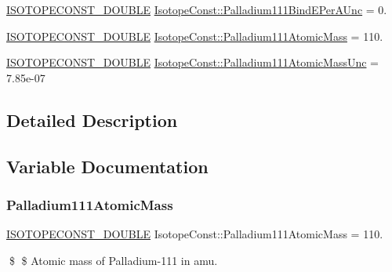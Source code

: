 \begin{DoxyCompactItemize}
\mbox{\hyperlink{group___isotope_const-_macros_ga8f45a7272ce02c0b4c65c44636ed719a}{I\+S\+O\+T\+O\+P\+E\+C\+O\+N\+S\+T\+\_\+\+D\+O\+U\+B\+LE}} \mbox{\hyperlink{group___isotope_const-_palladium-_pd111_ga1740871993ac710bd7fbffdfcb28a1eb}{Isotope\+Const\+::\+Palladium111\+Bind\+E\+Per\+A\+Unc}} = 0.
\item 
\mbox{\hyperlink{group___isotope_const-_macros_ga8f45a7272ce02c0b4c65c44636ed719a}{I\+S\+O\+T\+O\+P\+E\+C\+O\+N\+S\+T\+\_\+\+D\+O\+U\+B\+LE}} \mbox{\hyperlink{group___isotope_const-_palladium-_pd111_ga422aa436a782e6640e801fa681776fbe}{Isotope\+Const\+::\+Palladium111\+Atomic\+Mass}} = 110.
\item 
\mbox{\hyperlink{group___isotope_const-_macros_ga8f45a7272ce02c0b4c65c44636ed719a}{I\+S\+O\+T\+O\+P\+E\+C\+O\+N\+S\+T\+\_\+\+D\+O\+U\+B\+LE}} \mbox{\hyperlink{group___isotope_const-_palladium-_pd111_ga26053b0992e2b25d9604cf41f0a71ba8}{Isotope\+Const\+::\+Palladium111\+Atomic\+Mass\+Unc}} = 7.\+85e-\/07
\end{DoxyCompactItemize}


\subsection{Detailed Description}


\subsection{Variable Documentation}
\mbox{\label{group___isotope_const-_palladium-_pd111_ga422aa436a782e6640e801fa681776fbe}} 
\subsubsection{\texorpdfstring{Palladium111\+Atomic\+Mass}{Palladium111AtomicMass}}
{\footnotesize\ttfamily \mbox{\hyperlink{group___isotope_const-_macros_ga8f45a7272ce02c0b4c65c44636ed719a}{I\+S\+O\+T\+O\+P\+E\+C\+O\+N\+S\+T\+\_\+\+D\+O\+U\+B\+LE}} Isotope\+Const\+::\+Palladium111\+Atomic\+Mass = 110.}

\$ \$ Atomic mass of Palladium-\/111 in amu. \mbox{\label{group___isotope_const-_palladium-_pd111_ga26053b0992e2b25d9604cf41f0a71ba8}} 
